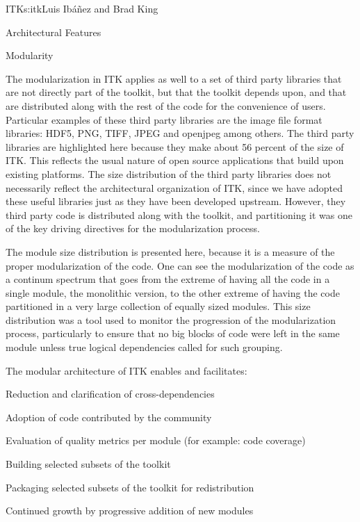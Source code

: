 \begin{aosachapter}{ITK}{s:itk}{Luis Ib\'{a}\~{n}ez and Brad King}
\begin{aosasect1}{Architectural Features}
\begin{aosasect2}{Modularity}

The modularization in ITK applies as well to a set of third party libraries
that are not directly part of the toolkit, but that the toolkit depends upon,
and that are distributed along with the rest of the code for the convenience of
users. Particular examples of these third party libraries are the image file
format libraries: HDF5, PNG, TIFF, JPEG and openjpeg among others.  The third
party libraries are highlighted here because they make about 56 percent of the
size of ITK. This reflects the usual nature of open source applications that
build upon existing platforms. The size distribution of the third party
libraries does not necessarily reflect the architectural organization of ITK,
since we have adopted these useful libraries just as they have been developed
upstream. However, they third party code is distributed along with the toolkit,
and partitioning it was one of the key driving directives for the
modularization process.

The module size distribution is presented here, because it is a measure of the
proper modularization of the code. One can see the modularization of the code
as a continum spectrum that goes from the extreme of having all the code in a
single module, the monolithic version, to the other extreme of having the code
partitioned in a very large collection of equally sized modules. This size
distribution was a tool used to monitor the progression of the modularization
process, particularly to ensure that no big blocks of code were left in the
same module unless true logical dependencies called for such grouping.

The modular architecture of ITK enables and facilitates:

\begin{aosaitemize}
\item Reduction and clarification of cross-dependencies
\item Adoption of code contributed by the community
\item Evaluation of quality metrics per module (for example: code coverage)
\item Building selected subsets of the toolkit
\item Packaging selected subsets of the toolkit for redistribution
\item Continued growth by progressive addition of new modules
\end{aosaitemize}
\end{aosasect2}


\end{aosasect1}
\end{aosachapter}
